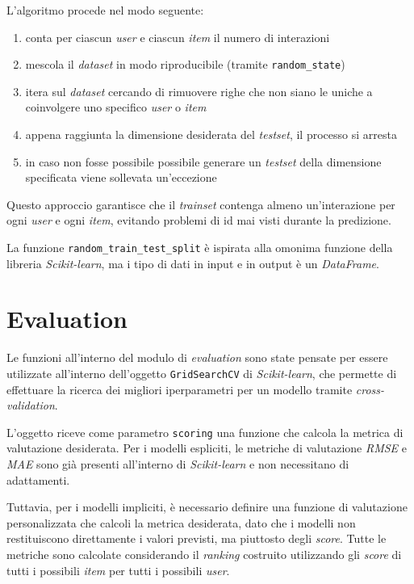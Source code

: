 L'algoritmo procede nel modo seguente:
\begin{enumerate}
    \item conta per ciascun \textit{user} e ciascun \textit{item} il numero di interazioni
    \item mescola il \textit{dataset} in modo riproducibile (tramite \texttt{random\_state})
    \item itera sul \textit{dataset} cercando di rimuovere righe che non siano le uniche a coinvolgere uno specifico \textit{user} o \textit{item}
    \item appena raggiunta la dimensione desiderata del \textit{testset}, il processo si arresta
    \item in caso non fosse possibile possibile generare un \textit{testset} della dimensione specificata viene sollevata un'eccezione
\end{enumerate}

Questo approccio garantisce che il \textit{trainset} contenga almeno un'interazione per ogni \textit{user} e ogni \textit{item}, evitando problemi di id mai visti durante la predizione.

La funzione \texttt{random\_train\_test\_split} è ispirata alla omonima funzione della libreria \textit{Scikit-learn}, ma i tipo di dati in input e in output è un \textit{DataFrame}.

\section{Evaluation}

Le funzioni all'interno del modulo di \textit{evaluation} sono state pensate per essere utilizzate all'interno dell'oggetto \texttt{GridSearchCV} di \textit{Scikit-learn}, che permette di effettuare la ricerca dei migliori iperparametri per un modello tramite \textit{cross-validation}.

L'oggetto riceve come parametro \texttt{scoring} una funzione che calcola la metrica di valutazione desiderata. Per i modelli espliciti, le metriche di valutazione \textit{RMSE} e \textit{MAE} sono già presenti all'interno di \textit{Scikit-learn} e non necessitano di adattamenti. 

Tuttavia, per i modelli impliciti, è necessario definire una funzione di valutazione personalizzata che calcoli la metrica desiderata, dato che i modelli non restituiscono direttamente i valori previsti, ma piuttosto degli \textit{score}. Tutte le metriche sono calcolate considerando il \textit{ranking} costruito utilizzando gli \textit{score} di tutti i possibili \textit{item} per tutti i possibili \textit{user}.

